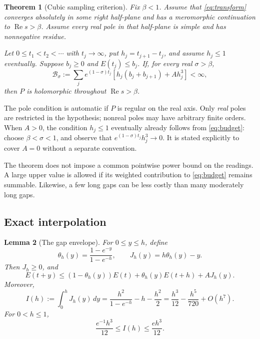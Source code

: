 \documentclass[11pt,a4paper]{article}
\newtheorem{theorem}{Theorem}[section]
\newtheorem{lemma}[theorem]{Lemma}
\theoremstyle{definition}
\theoremstyle{remark}
\numberwithin{equation}{section}
\newcommand{\Rea}{\operatorname{Re}}
\begin{document}
\begin{theorem}[Cubic sampling criterion]
\label{thm:cubic}
Fix \(\beta<1\). Assume that \eqref{eq:transform} converges absolutely
in some right half-plane and has a meromorphic continuation to
\(\Rea s>\beta\). Assume every real pole in that half-plane is simple
and has nonnegative residue.

Let \(0\leq t_1<t_2<\cdots\) with \(t_j\to\infty\), put
\(h_j=t_{j+1}-t_j\), and assume \(h_j\leq1\) eventually. Suppose
\(b_j\geq0\) and \(E(t_j)\leq b_j\). If, for every real
\(\sigma>\beta\),
\begin{equation}
 \mathcal B_\sigma
 :=\sum_j e^{(1-\sigma)t_j}
       \left[h_j(b_j+b_{j+1})+A h_j^3\right]<\infty,
 \label{eq:budget}
\end{equation}
then \(P\) is holomorphic throughout \(\Rea s>\beta\).
\end{theorem}

The pole condition is automatic if \(P\) is regular on the real axis.
Only \emph{real} poles are restricted in the hypothesis; nonreal poles
may have arbitrary finite orders. When \(A>0\), the condition
\(h_j\leq1\) eventually already follows from
\eqref{eq:budget}: choose \(\beta<\sigma<1\), and observe that
\(e^{(1-\sigma)t_j}h_j^3\to0\). It is stated explicitly to cover
\(A=0\) without a separate convention.

The theorem does not impose a common pointwise power bound on the
readings. A large upper value is allowed if its weighted contribution
to \eqref{eq:budget} remains summable. Likewise, a few long gaps can be
less costly than many moderately long gaps.

\subsection{Exact interpolation}

\begin{lemma}[The gap envelope]
\label{lem:envelope}
For \(0\leq y\leq h\), define
\[
 \theta_h(y)=\frac{1-e^{-y}}{1-e^{-h}},\qquad
 J_h(y)=h\theta_h(y)-y.
\]
Then \(J_h\geq0\), and
\begin{equation}
 E(t+y)\leq(1-\theta_h(y))E(t)+\theta_h(y)E(t+h)
              +A J_h(y).
 \label{eq:envelope}
\end{equation}
Moreover,
\begin{equation}
 I(h):=\int_0^hJ_h(y)\,dy
   =\frac{h^2}{1-e^{-h}}-h-\frac{h^2}{2}
   =\frac{h^3}{12}-\frac{h^5}{720}+O(h^7).
 \label{eq:exactcost}
\end{equation}
For \(0<h\leq1\),
\begin{equation}
 \frac{e^{-1}h^3}{12}\leq I(h)\leq\frac{eh^3}{12}.
 \label{eq:cubiccost}
\end{equation}
\end{lemma}
\end{document}
